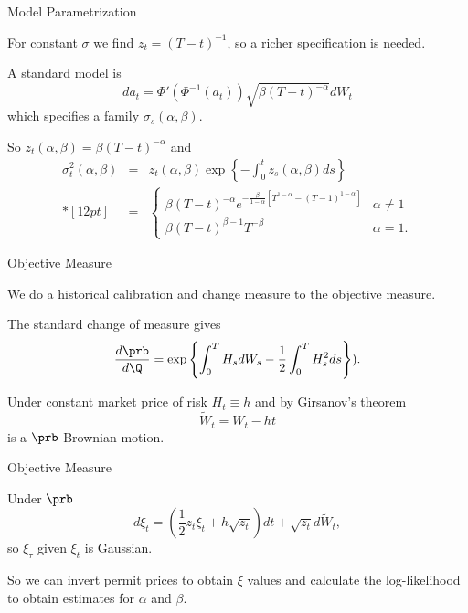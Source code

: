 {Model Parametrization}


	For constant $\sigma$ we find $z_t=(T-t)^{-1}$, so a richer specification is needed.

	A standard model is
$$
da_t = \Phi'\left(\Phi^{-1}(a_t)\right)\sqrt{\beta(T-t)^{-\alpha}}dW_t
$$
which specifies a family $\sigma_s(\alpha,\beta)$.

So $z_t(\alpha, \beta) = \beta(T-t)^{-\alpha}$ and
$$
\begin{array}{lll}
\sigma_t^2(\alpha,\beta)&=& \displaystyle z_t(\alpha, \beta) \exp\left\{-\int_0^t z_s(\alpha, \beta) ds \right\}\\*[12pt]
&=&\displaystyle
\left\{
\begin{array}{ll}
\beta(T-t)^{-\alpha} e^{-\frac{\beta}{1-\alpha}[T^{1-\alpha}-(T-1)^{1-\alpha}]} &\alpha \not=1\\
\beta(T-t)^{\beta-1}T^{-\beta} &\alpha=1.
\end{array}
\right.
\end{array}
$$


{Objective Measure}


	We do a historical calibration and change measure to the objective measure.

	The standard change of measure gives
$$
\frac{d\prb}{d\Q} = \exp\left\{\int_0^T H_s dW_s -\frac{1}{2} \int_0^T H_s^2ds \right\}).
$$

Under constant market price of risk $H_t \equiv h$ and by Girsanov's theorem
$$
\tilde{W}_t = W_t - ht
$$
is a $\prb$ Brownian motion.


{Objective Measure}


Under $\prb$
$$
d\xi_t = \left(\frac{1}{2} z_t \xi_t + h \sqrt{z_t} \right)dt + \sqrt{z_t} d\tilde{W}_t,
$$
so $\xi_{\tau}$ given $\xi_t$ is Gaussian.

	So we can invert permit prices to obtain $\xi$ values and calculate the log-likelihood to obtain
estimates for $\alpha$ and $\beta$.



